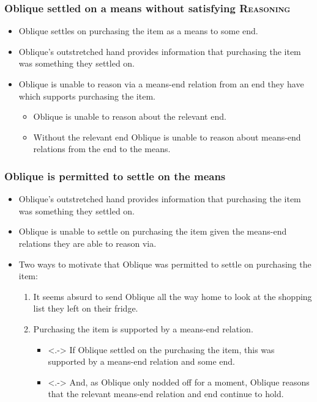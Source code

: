 \documentclass[noamssymb,
graphics,
]{beamer} %
\newcommand{\hand}{\ding{43}}
\newcommand{\schemaName}[1]{\textsc{#1}}
\newcommand{\hozlinedash}[0]{
  \noindent\hdashrule[0.5ex][c]{\textwidth}{.1pt}{2.5pt}
}
\begin{document}
\begin{frame}
  \frametitle{Oblique settled on a means without satisfying \schemaName{Reasoning}}

  \begin{itemize}
  \item Oblique settles on purchasing the item as a means to some end.
  \item Oblique's outstretched hand provides information that purchasing the item was something they settled on.
  \item[\hand] Oblique is unable to reason via a means-end relation from an end they have which supports purchasing the item.
    \begin{itemize}
    \item Oblique is unable to reason about the relevant end.
    \item Without the relevant end Oblique is unable to reason about means-end relations from the end to the means.
    \end{itemize}
  \end{itemize}

\end{frame}


\begin{frame}
  \frametitle{Oblique is permitted to settle on the means}

  \begin{itemize}
  \item<+> Oblique's outstretched hand provides information that purchasing the item was something they settled on.
  \item<+> Oblique is unable to settle on purchasing the item given the means-end relations they are able to reason via.
  \end{itemize}
  \hozlinedash
  \vspace{-15pt}
  \begin{itemize}
  \item<+-> Two ways to motivate that Oblique was permitted to settle on purchasing the item:
    \begin{enumerate}
    \item<+> It seems absurd to send Oblique all the way home to look at the shopping list they left on their fridge.
    \item<+-> Purchasing the item is supported by a means-end relation.
      \begin{itemize}
      \item<.-> If Oblique settled on the purchasing the item, this was supported by a means-end relation and some end.
      \item<.-> And, as Oblique only nodded off for a moment, Oblique reasons that the relevant means-end relation and end continue to hold.
      \end{itemize}
    \end{enumerate}
  \end{itemize}

\end{frame}
\end{document}
